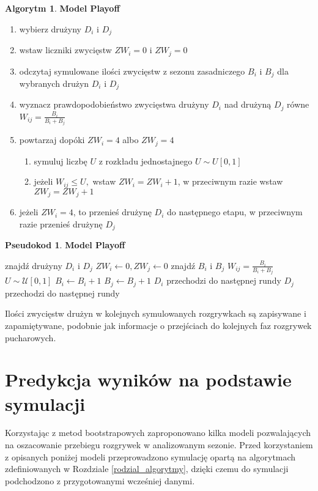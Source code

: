\documentclass[inzynierska]{pwr_wmat_praca_dyplomowa}
\theoremstyle{plain}
\numberwithin{theorem}{chapter}
\theoremstyle{definition}
\numberwithin{theorem}{chapter}
\newtheorem{algorytm}[theorem]{Algorytm}
\newtheorem{pseudokod}[theorem]{Pseudokod}
\begin{document}
\begin{algorytm} \textbf{Model Playoff}
	\begin{enumerate}
		\item wybierz drużyny $D_i$ i $D_j$
		\item wstaw liczniki zwycięstw $ZW_i=0$ i $ZW_j=0$
		\item odczytaj symulowane ilości zwycięstw z sezonu zasadniczego $B_i$ i $B_j$ dla wybranych drużyn $D_i$ i $D_j$
		\item wyznacz prawdopodobieństwo zwycięstwa drużyny $D_i$ nad drużyną $D_j$ równe $W_{ij}=\frac{B_i}{B_i + B_j}$
		\item powtarzaj dopóki  $ZW_i=4$ albo $ZW_j=4$
		\begin{enumerate}
			\item symuluj liczbę $U$ z rozkładu jednostajnego $U\sim U[0,1]$ 
			\item jeżeli $W_{ij} \leq U,$ wstaw $ZW_i=ZW_i+1$, w przeciwnym razie wstaw $ZW_j=ZW_j+1$
		\end{enumerate}
		\item jeżeli $ZW_i=4$, to przenieś drużynę $D_i$ do następnego etapu, w przeciwnym razie przenieś drużynę $D_j$
	\end{enumerate}
\end{algorytm} 

\begin{pseudokod} 
	\textbf{Model Playoff}
	\begin{algorithmic}[1]
		\State znajdź drużyny $D_i$ i $D_j$
		\State $ZW_i\gets 0,ZW_j\gets 0$
		\State znajdź $B_{i}$ i $B_{j}$ 
		\State $W_{ij}=\frac{B_i}{B_i + B_j}$
		\State $U\sim \mathcal{U}[0,1]$
		\State $B_i \gets B_i+1$
		\Else
		\State $B_j \gets B_j+1$
		\EndIf
		\EndWhile
		\State $D_i$ przechodzi do następnej rundy
		\Else
		\State $D_j$ przechodzi do następnej rundy
		\EndIf
	\end{algorithmic}
\end{pseudokod}

Ilości zwycięstw drużyn w kolejnych symulowanych rozgrywkach są zapisywane i zapamiętywane, podobnie jak informacje o przejściach do kolejnych faz rozgrywek pucharowych. 

\section{Predykcja wyników na podstawie symulacji}
Korzystając z metod bootstrapowych zaproponowano kilka modeli pozwalających na oszacowanie przebiegu rozgrywek w analizowanym sezonie.
Przed korzystaniem z opisanych poniżej modeli przeprowadzono symulację opartą na algorytmach zdefiniowanych w Rozdziale \ref{rodzial_algorytmy}, dzięki czemu do symulacji podchodzono z przygotowanymi wcześniej danymi.
\end{document}

